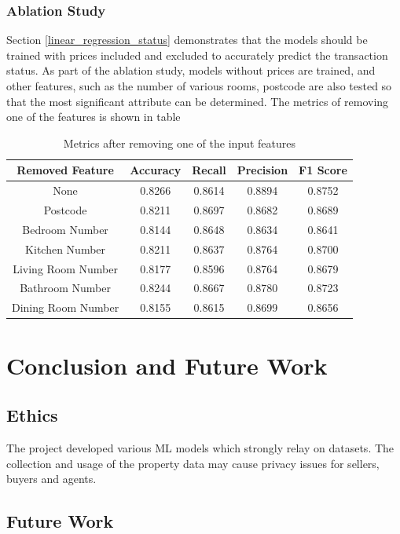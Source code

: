 \documentclass[12pt,twoside]{report}
\begin{document}
\subsection{Ablation Study}
Section \ref{linear_regression_status} demonstrates that the models should be trained with prices included and excluded to accurately predict the transaction status. As part of the ablation study, models without prices are trained, and other features, such as the number of various rooms, postcode are also tested so that the most significant attribute can be determined. The metrics of removing one of the features is shown in table 

\begin{table}[H]
	\centering
	\caption{Metrics after removing one of the input features}
	\label{ablation_status}
	\begin{tabular}{| c | c | c | c | c | }
		\hline
		Removed Feature & Accuracy & Recall & Precision & F1 Score \\
		\hline
		None & 0.8266 & 0.8614 & 0.8894 & 0.8752 \\
		\hline
		Postcode & 0.8211 & 0.8697 & 0.8682 & 0.8689 \\
		\hline
		Bedroom Number & 0.8144 & 0.8648 & 0.8634 & 0.8641 \\
		\hline
		Kitchen Number & 0.8211 & 0.8637 & 0.8764 & 0.8700 \\
		\hline
		Living Room Number & 0.8177 & 0.8596 & 0.8764 & 0.8679 \\
		\hline
		Bathroom Number & 0.8244 & 0.8667 & 0.8780 & 0.8723 \\
		\hline
		Dining Room Number & 0.8155 & 0.8615 & 0.8699 & 0.8656 \\
		\hline
	\end{tabular}
\end{table}

\chapter{Conclusion and Future Work}
\section{Ethics}
The project developed various ML models which strongly relay on datasets. The collection and usage of the property data may cause privacy issues for sellers, buyers and agents. 

\section{Future Work}
\end{document}

